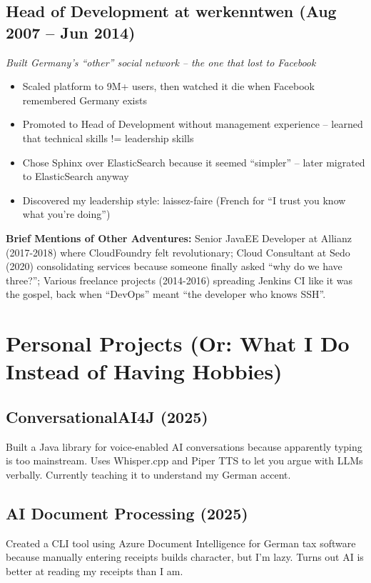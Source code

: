 \documentclass[10pt,a4paper]{article}
\begin{document}
\subsection*{Head of Development at werkenntwen (Aug 2007 -- Jun 2014)}
\textit{Built Germany's ``other'' social network -- the one that lost to Facebook}

\begin{itemize}[leftmargin=*, topsep=0pt, itemsep=1pt]
\item Scaled platform to 9M+ users, then watched it die when Facebook remembered Germany exists
\item Promoted to Head of Development without management experience -- learned that technical skills != leadership skills
\item Chose Sphinx over ElasticSearch because it seemed ``simpler'' -- later migrated to ElasticSearch anyway
\item Discovered my leadership style: laissez-faire (French for ``I trust you know what you're doing'')
\end{itemize}

\textbf{Brief Mentions of Other Adventures:} Senior JavaEE Developer at Allianz (2017-2018) where CloudFoundry felt revolutionary; Cloud Consultant at Sedo (2020) consolidating services because someone finally asked ``why do we have three?''; Various freelance projects (2014-2016) spreading Jenkins CI like it was the gospel, back when ``DevOps'' meant ``the developer who knows SSH''.

\section*{Personal Projects (Or: What I Do Instead of Having Hobbies)}

\subsection*{ConversationalAI4J (2025)}
Built a Java library for voice-enabled AI conversations because apparently typing is too mainstream. Uses Whisper.cpp and Piper TTS to let you argue with LLMs verbally. Currently teaching it to understand my German accent.

\subsection*{AI Document Processing (2025)}
Created a CLI tool using Azure Document Intelligence for German tax software because manually entering receipts builds character, but I'm lazy. Turns out AI is better at reading my receipts than I am.
\end{document}
